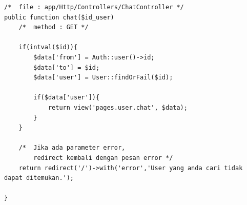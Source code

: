 \begin{lstlisting}[label=cdbe.04-04,style=php,caption=Kode Sumber \textit{Back-end} Mengirimkan Pesan]
/*	file : app/Http/Controllers/ChatController */
public function chat($id_user)
	/*	method : GET */

    if(intval($id)){
        $data['from'] = Auth::user()->id;
        $data['to'] = $id;
        $data['user'] = User::findOrFail($id);

        if($data['user']){
            return view('pages.user.chat', $data);
        }
    }

    /* 	Jika ada parameter error, 
    	redirect kembali dengan pesan error */
    return redirect('/')->with('error','User yang anda cari tidak dapat ditemukan.');

}
\end{lstlisting}

